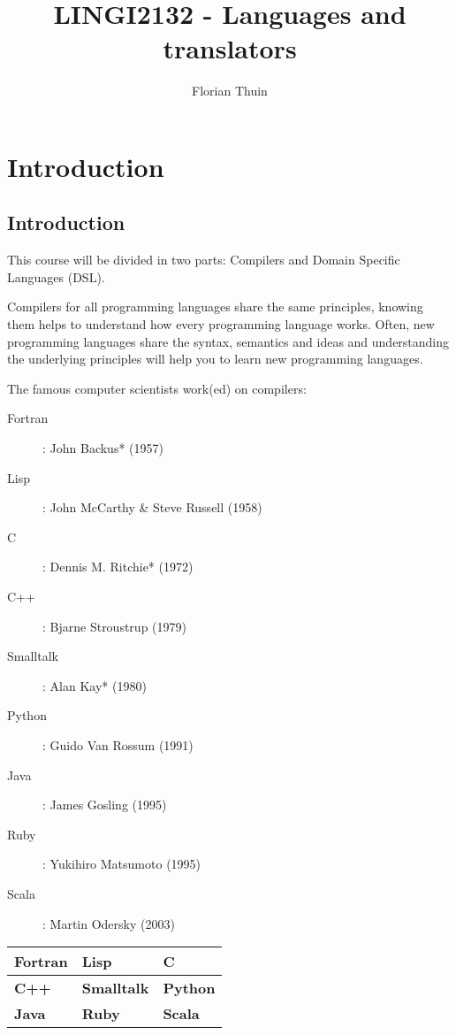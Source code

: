 \documentclass[12pt, a4paper]{article}
\author{Florian Thuin}
\title{LINGI2132 - Languages and translators}
\begin{document}
  \section{Introduction}
  \subsection{Introduction}

  This course will be divided in two parts: Compilers and Domain Specific
  Languages (DSL). \newline

  Compilers for all programming languages share the same principles, knowing
  them helps to understand how every programming language works. Often, new
  programming languages share the syntax, semantics and ideas and understanding
  the underlying principles will help you to learn new programming languages.
  \newline

  The famous computer scientists work(ed) on compilers:

  \begin{description}
    \item[Fortran]: John Backus* (1957)
    \item[Lisp]: John McCarthy \& Steve Russell (1958)
    \item[C]: Dennis M. Ritchie* (1972)
    \item[C++]: Bjarne Stroustrup (1979)
    \item[Smalltalk]: Alan Kay* (1980)
    \item[Python]: Guido Van Rossum (1991)
    \item[Java]: James Gosling (1995)
    \item[Ruby]: Yukihiro Matsumoto (1995)
    \item[Scala]: Martin Odersky (2003)
  \end{description}

  \begin{tabular}{|l|l|l|}
    \hline
    \textbf{Fortran} & \textbf{Lisp} & \textbf{C} \\
    \hline

    \hline
    \textbf{C++} & \textbf{Smalltalk} & \textbf{Python} \\
    \hline
    \hline
    \textbf{Java} & \textbf{Ruby} & \textbf{Scala}
    \hline
  \end{tabular}

\end{document}
